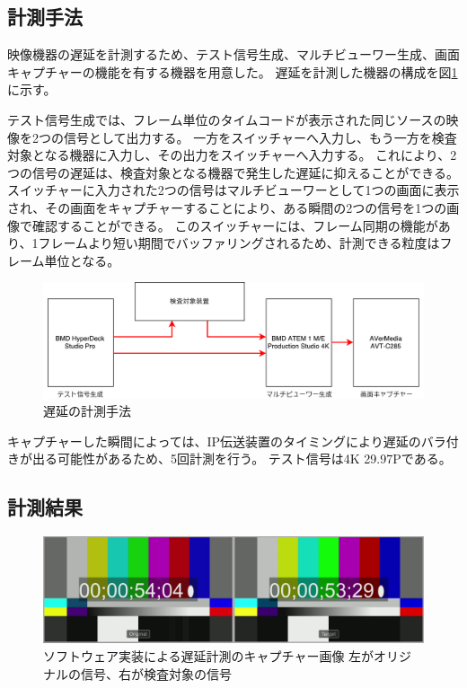\subsection{計測手法}

映像機器の遅延を計測するため、テスト信号生成、マルチビューワー生成、画面キャプチャーの機能を有する機器を用意した。
遅延を計測した機器の構成を図\ref{fig:evaluate-diagram}に示す。

テスト信号生成では、フレーム単位のタイムコードが表示された同じソースの映像を2つの信号として出力する。
一方をスイッチャーへ入力し、もう一方を検査対象となる機器に入力し、その出力をスイッチャーへ入力する。
これにより、2つの信号の遅延は、検査対象となる機器で発生した遅延に抑えることができる。
スイッチャーに入力された2つの信号はマルチビューワーとして1つの画面に表示され、その画面をキャプチャーすることにより、ある瞬間の2つの信号を1つの画像で確認することができる。
このスイッチャーには、フレーム同期の機能があり、1フレームより短い期間でバッファリングされるため、計測できる粒度はフレーム単位となる。

\begin{figure}[htbp]
  \begin{center}
    \includegraphics[bb=0 0 697 212,width=15cm]{img/evaluate-diagram.pdf}
  \end{center}
  \caption{遅延の計測手法}
  \label{fig:evaluate-diagram}
\end{figure}

キャプチャーした瞬間によっては、IP伝送装置のタイミングにより遅延のバラ付きが出る可能性があるため、5回計測を行う。
テスト信号は4K 29.97Pである。

\subsection{計測結果}

\begin{figure}[htbp]
  \begin{center}
    \includegraphics[bb=0 0 1920 540,width=14cm]{img/evaluate-delay-software-1.png}
  \end{center}
  \caption[ソフトウェア実装による遅延計測のキャプチャー画像]{ソフトウェア実装による遅延計測のキャプチャー画像 左がオリジナルの信号、右が検査対象の信号}
  \label{fig:evaluate-delay-software-1}
\end{figure}

